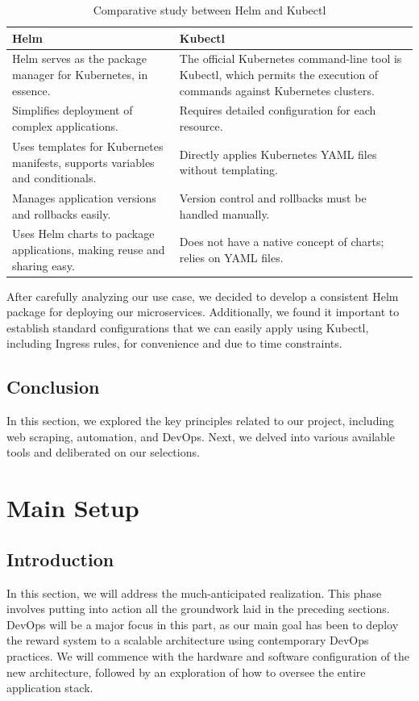 \begin{table}[h!]
  \centering
  \renewcommand{\arraystretch}{1.5} 
  \caption{Comparative study between Helm and Kubectl}
  \label{tab:comparative_study_between_helm_and_kubectl}
  \begin{tabularx}{\textwidth}{|>{\centering\arraybackslash}X|>{\centering\arraybackslash}X|}
      \hline
      \rowcolor{blue!20} 
      \textbf{Helm} & \textbf{Kubectl} \\
      \hline
      Helm serves as the package manager for Kubernetes, in essence. & The official Kubernetes command-line tool is Kubectl, which permits the execution of commands against Kubernetes clusters. \\
      \hline
      Simplifies deployment of complex applications. & Requires detailed configuration for each resource.  \\
      \hline
      Uses templates for Kubernetes manifests, supports variables and conditionals. & Directly applies Kubernetes YAML files without templating.  \\
      \hline
      Manages application versions and rollbacks easily. & Version control and rollbacks must be handled manually.  \\
      \hline
      Uses Helm charts to package applications, making reuse and sharing easy. & Does not have a native concept of charts; relies on YAML files.   \\
      \hline
  \end{tabularx}
\end{table}
After carefully analyzing our use case, we decided to develop a consistent Helm package for deploying our microservices.
Additionally, we found it important to establish standard configurations that we can easily apply using Kubectl, including Ingress rules, for convenience and due to time constraints.

\subsection{Conclusion}
In this section, we explored the key principles related to our project, including web scraping, automation, and DevOps. Next, we delved into various available tools and deliberated on our selections.


\section{Main Setup}
\subsection{Introduction}
In this section, we will address the much-anticipated realization. This phase involves putting into action all the groundwork laid in the preceding sections. DevOps will be a major focus in this part, as our main goal has been to deploy the reward system to a scalable architecture using contemporary DevOps practices. We will commence with the hardware and software configuration of the new architecture, followed by an exploration of how to oversee the entire application stack.

